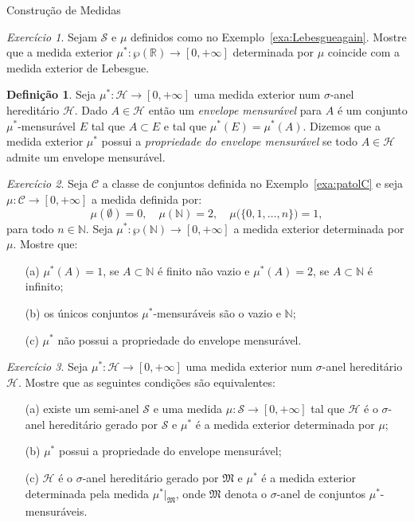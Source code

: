 \documentclass[oneside,final,11pt]{amsbook}
\newcommand{\R}{\mathds R}
\newcommand{\N}{\mathds N}
\theoremstyle{remark}\newtheorem{exercise}{Exercício}[chapter]
\theoremstyle{remark}\newtheorem{*exercise}[exercise]{\hbox to 0pt{\hskip 0pt minus 1fil*}Exercício}
\theoremstyle{definition}\newtheorem{exdefin}{Definição}[chapter]
\theoremstyle{plain}\newtheorem{teo}{Teorema}[section]
\theoremstyle{plain}\newtheorem{lem}[teo]{Lema}
\theoremstyle{plain}\newtheorem{prop}[teo]{Proposição}
\theoremstyle{plain}\newtheorem{cor}[teo]{Corolário}
\theoremstyle{definition}\newtheorem{defin}[teo]{Definição}
\theoremstyle{remark}\newtheorem{rem}[teo]{Observação}
\theoremstyle{definition}\newtheorem{notation}[teo]{Notação}
\theoremstyle{definition}\newtheorem{convention}[teo]{Convenção}
\theoremstyle{definition}\newtheorem{example}[teo]{Exemplo}
\numberwithin{section}{chapter}
\numberwithin{equation}{section}
\begin{document}
\begin{chapter}{Construção de Medidas}
\begin{exercise}\label{exe:medextehLeb}
Sejam $\mathcal S$ e $\mu$ definidos como no Exemplo~\ref{exa:Lebesgueagain}. Mostre que
a medida exterior $\mu^*:\wp(\R)\to[0,+\infty]$ determinada por $\mu$
coincide com a medida exterior de Lebesgue.
\end{exercise}

\begin{exdefin}
Seja $\mu^*:\mathcal H\to[0,+\infty]$ uma medida exterior num $\sigma$-anel hereditário
$\mathcal H$. Dado $A\in\mathcal H$ então um {\em envelope mensurável\/}%
 para $A$ é um conjunto $\mu^*$-mensurável $E$
tal que $A\subset E$ e tal que $\mu^*(E)=\mu^*(A)$. Dizemos que a medida exterior
$\mu^*$ possui a {\em propriedade do envelope mensurável\/}%
 se todo $A\in\mathcal H$ admite um
envelope mensurável.
\end{exdefin}

\begin{exercise}
Seja $\mathcal C$ a classe de conjuntos definida no Exemplo~\ref{exa:patolC} e seja
$\mu:\mathcal C\to[0,+\infty]$ a medida definida por:
\[\mu(\emptyset)=0,\quad\mu(\N)=2,\quad\mu\big(\{0,1,\ldots,n\}\big)=1,\]
para todo $n\in\N$. Seja $\mu^*:\wp(\N)\to[0,+\infty]$ a medida exterior determinada
por $\mu$. Mostre que:
\begin{itemize}
\item[(a)] $\mu^*(A)=1$, se $A\subset\N$ é finito não vazio e $\mu^*(A)=2$,
se $A\subset\N$ é infinito;
\item[(b)] os únicos conjuntos $\mu^*$-mensuráveis são o vazio e $\N$;
\item[(c)] $\mu^*$ não possui a propriedade do envelope mensurável.
\end{itemize}
\end{exercise}

\begin{exercise}
Seja $\mu^*:\mathcal H\to[0,+\infty]$ uma medida exterior num $\sigma$-anel hereditário
$\mathcal H$. Mostre que as seguintes condições são equivalentes:
\begin{itemize}
\item[(a)] existe um semi-anel $\mathcal S$ e uma medida $\mu:\mathcal S\to[0,+\infty]$
tal que $\mathcal H$ é o $\sigma$-anel hereditário gerado por $\mathcal S$ e $\mu^*$
é a medida exterior determinada por $\mu$;
\item[(b)] $\mu^*$ possui a propriedade do envelope mensurável;
\item[(c)] $\mathcal H$ é o $\sigma$-anel hereditário gerado por $\mathfrak M$
e $\mu^*$ é a medida exterior determinada pela medida $\mu^*\vert_{\mathfrak M}$,
onde $\mathfrak M$ denota o $\sigma$-anel de conjuntos $\mu^*$-mensuráveis.
\end{itemize}
\end{exercise}


\end{chapter}
\end{document}

